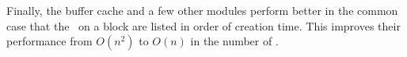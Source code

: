 
Finally, the buffer cache and a few other modules perform better in the
common case that the \patches\ on a block are listed in order of creation
time.
%
This improves their performance from $O(n^2)$ to $O(n)$ in the number of
\patches.


\begin{comment}
Several functions in \Kudos\ iterate over lists of \patches\ looking for either
a single \patch\ or set of \patches\ satisfying some property, or trying to
process all the \patches\ in the list in some order determined by the dependency
graph. It is generally the case that the \patches\ satisfying the property or
the order in which the \patches\ should be processed can be determined very
quickly by keeping the lists sorted. For instance, the library function which
rolls \patches\ back needs to perform the rollbacks essentially in inverse
creation order, so that rolling back a \patch\ which has since been overwritten
by a later \patch\ does the right thing. Keeping the list of all \patches\ on a
block sorted in creation order (which is very easy) makes this an efficient
operation, while it might otherwise take $O(n^2)$ time to execute. Similarly,
many \patch\ merging functions need to find for a given block some \patch\
which has no \befores\ on the same block, and the oldest \patch\ on a block
always satisfies this requirement.
\end{comment}
